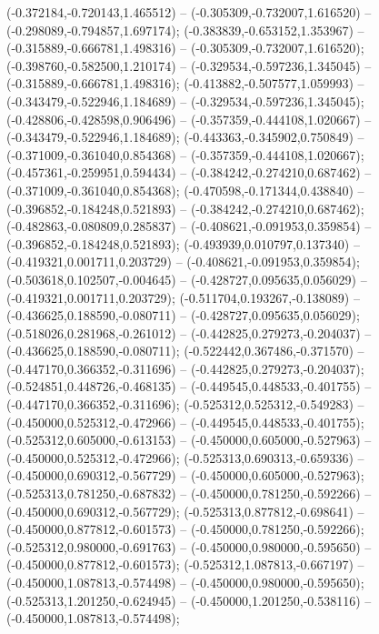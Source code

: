  (-0.372184,-0.720143,1.465512) -- (-0.305309,-0.732007,1.616520) -- (-0.298089,-0.794857,1.697174);
 (-0.383839,-0.653152,1.353967) -- (-0.315889,-0.666781,1.498316) -- (-0.305309,-0.732007,1.616520);
 (-0.398760,-0.582500,1.210174) -- (-0.329534,-0.597236,1.345045) -- (-0.315889,-0.666781,1.498316);
 (-0.413882,-0.507577,1.059993) -- (-0.343479,-0.522946,1.184689) -- (-0.329534,-0.597236,1.345045);
 (-0.428806,-0.428598,0.906496) -- (-0.357359,-0.444108,1.020667) -- (-0.343479,-0.522946,1.184689);
 (-0.443363,-0.345902,0.750849) -- (-0.371009,-0.361040,0.854368) -- (-0.357359,-0.444108,1.020667);
 (-0.457361,-0.259951,0.594434) -- (-0.384242,-0.274210,0.687462) -- (-0.371009,-0.361040,0.854368);
 (-0.470598,-0.171344,0.438840) -- (-0.396852,-0.184248,0.521893) -- (-0.384242,-0.274210,0.687462);
 (-0.482863,-0.080809,0.285837) -- (-0.408621,-0.091953,0.359854) -- (-0.396852,-0.184248,0.521893);
 (-0.493939,0.010797,0.137340) -- (-0.419321,0.001711,0.203729) -- (-0.408621,-0.091953,0.359854);
 (-0.503618,0.102507,-0.004645) -- (-0.428727,0.095635,0.056029) -- (-0.419321,0.001711,0.203729);
 (-0.511704,0.193267,-0.138089) -- (-0.436625,0.188590,-0.080711) -- (-0.428727,0.095635,0.056029);
 (-0.518026,0.281968,-0.261012) -- (-0.442825,0.279273,-0.204037) -- (-0.436625,0.188590,-0.080711);
 (-0.522442,0.367486,-0.371570) -- (-0.447170,0.366352,-0.311696) -- (-0.442825,0.279273,-0.204037);
 (-0.524851,0.448726,-0.468135) -- (-0.449545,0.448533,-0.401755) -- (-0.447170,0.366352,-0.311696);
 (-0.525312,0.525312,-0.549283) -- (-0.450000,0.525312,-0.472966) -- (-0.449545,0.448533,-0.401755);
 (-0.525312,0.605000,-0.613153) -- (-0.450000,0.605000,-0.527963) -- (-0.450000,0.525312,-0.472966);
 (-0.525313,0.690313,-0.659336) -- (-0.450000,0.690312,-0.567729) -- (-0.450000,0.605000,-0.527963);
 (-0.525313,0.781250,-0.687832) -- (-0.450000,0.781250,-0.592266) -- (-0.450000,0.690312,-0.567729);
 (-0.525313,0.877812,-0.698641) -- (-0.450000,0.877812,-0.601573) -- (-0.450000,0.781250,-0.592266);
 (-0.525312,0.980000,-0.691763) -- (-0.450000,0.980000,-0.595650) -- (-0.450000,0.877812,-0.601573);
 (-0.525312,1.087813,-0.667197) -- (-0.450000,1.087813,-0.574498) -- (-0.450000,0.980000,-0.595650);
 (-0.525313,1.201250,-0.624945) -- (-0.450000,1.201250,-0.538116) -- (-0.450000,1.087813,-0.574498);
